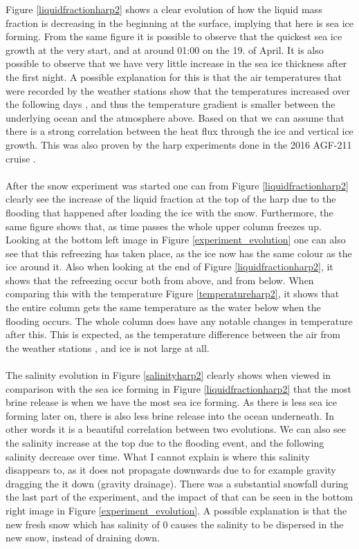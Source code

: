 Figure \autoref{liquidfractionharp2} shows a clear evolution of how the liquid mass fraction is decreasing in the beginning at the surface, implying that here is sea ice forming. From the same figure it is possible to observe that the quickest sea ice growth at the very start, and at around 01:00 on the 19. of April. It is also possible to observe that we have very little increase in the sea ice thickness after the first night. A possible explanation for this is that the air temperatures that were recorded by the weather stations show that the temperatures increased over the following days \textcite{Weather}, and thus the temperature gradient is smaller between the underlying ocean and the atmosphere above. Based on that we can assume that there is a strong correlation between the heat flux through the ice and vertical ice growth. This was also proven by the harp experiments done in the 2016 AGF-211 cruise \textcite{2016icegrowth}.\\
\\
After the snow experiment was started one can from Figure \autoref{liquidfractionharp2} clearly see the increase of the liquid fraction at the top of the harp due to the flooding that happened after loading the ice with the snow. Furthermore, the same figure shows that, as time passes the whole upper column freezes up. Looking at the bottom left image in Figure \autoref{experiment_evolution} one can also see that this refreezing has taken place, as the ice now has the same colour as the ice around it. Also when looking at the end of Figure \autoref{liquidfractionharp2}, it shows that the refreezing occur both from above, and from below. When comparing this with the temperature Figure \autoref{temperatureharp2}, it shows that the entire column gets the same temperature as the water below when the flooding occurs. The whole column does have any notable changes in temperature after this. This is expected, as the temperature difference between the air from the weather stations \textcite{Weather}, and ice is not large at all.\\
\\
The salinity evolution in Figure \autoref{salinityharp2} clearly shows when viewed in comparison with the sea ice forming in Figure \autoref{liquidfractionharp2} that the most brine release is when we have the most sea ice forming. As there is less sea ice forming later on, there is also less brine release into the ocean underneath. In other words it is a beautiful correlation between two evolutions. We can also see the salinity increase at the top due to the flooding event, and the following salinity decrease over time. What I cannot explain is where this salinity disappears to, as it does not propagate downwards due to for example gravity dragging the it down (gravity drainage). There was a substantial snowfall during the last part of the experiment, and the impact of that can be seen in the bottom right image in Figure \autoref{experiment_evolution}. A possible explanation is that the new fresh snow which has salinity of 0 causes the salinity to be dispersed in the new snow, instead of draining down.\\
